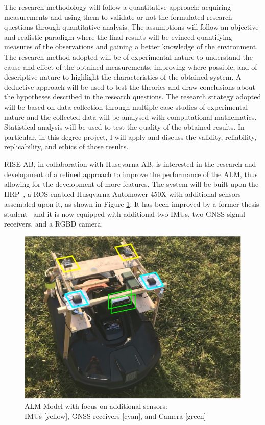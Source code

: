 \noindent
The research methodology\cite{RESEARCHMETHOD} will follow a quantitative approach: acquiring measurements and using them to validate or not the formulated research questions through quantitative analysis.
The assumptions will follow an objective and realistic paradigm where the final results will be evinced quantifying measures of the observations and gaining a better knowledge of the environment.
The research method adopted will be of experimental nature to understand the cause and effect of the obtained measurements, improving where possible, and of descriptive nature to highlight the characteristics of the obtained system.
A deductive approach will be used to test the theories and draw conclusions about the hypotheses described in the research questions.
The research strategy adopted will be based on data collection through multiple case studies of experimental nature and the collected data will be analysed with computational mathematics.
Statistical analysis will be used to test the quality of the obtained results.
In particular, in this degree project, I will apply and discuss the validity, reliability, replicability, and ethics of those results.

RISE AB, in collaboration with Husqvarna AB, is interested in the research and development of a refined approach to improve the performance of the \gls{ALM}, thus allowing for the development of more features.
The system will be built upon the \Gls{HRP}~\cite{HRP}, a \Gls{ROS} enabled Husqvarna Automower 450X with additional sensors assembled upon it, as shown in Figure \ref{fig:HardwareSetup}.
It has been improved by a former thesis student~\cite{HRPTianze} and it is now equipped with additional two \Glspl{IMU}, two \Gls{GNSS} signal receivers, and a \Gls{RGBD} camera.

\begin{figure}[!ht]
	\begin{center}
		\includegraphics[width=1.0\textwidth]{Images/1-Introduction/projectTheme.pdf}
		\caption{
			\gls{ALM} Model with focus on additional sensors:\\
		    \glspl{IMU} [yellow], \gls{GNSS} receivers [cyan], and Camera [green]
	\centering }
		\label{fig:HardwareSetup}
	\end{center}
\end{figure}


